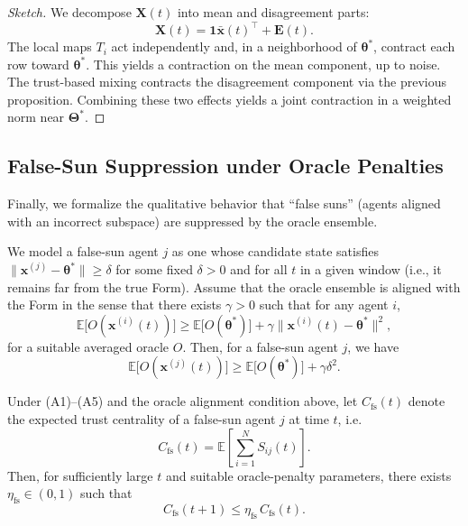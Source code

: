 \documentclass[11pt]{article}
\begin{document}
\begin{proof}[Sketch]
We decompose $\bm{X}(t)$ into mean and disagreement parts:
\[
  \bm{X}(t) = \bm{1} \bar{\bm{x}}(t)^\top + \bm{E}(t).
\]
The local maps $T_i$ act independently and, in a neighborhood of
$\bm{\theta}^*$, contract each row toward $\bm{\theta}^*$.
This yields a contraction on the mean component, up to noise.
The trust-based mixing contracts the disagreement component via the
previous proposition.
Combining these two effects yields a joint contraction in a weighted
norm near $\bm{\Theta}^*$.
\end{proof}

\subsection{False-Sun Suppression under Oracle Penalties}

Finally, we formalize the qualitative behavior that ``false suns'' (agents
aligned with an incorrect subspace) are suppressed by the oracle
ensemble.

We model a false-sun agent $j$ as one whose candidate state satisfies
$\|\bm{x}^{(j)} - \bm{\theta}^*\| \geq \delta$ for some fixed
$\delta > 0$ and for all $t$ in a given window (i.e., it remains far
from the true Form).
Assume that the oracle ensemble is aligned with the Form in the sense
that there exists $\gamma > 0$ such that for any agent $i$,
\[
  \mathbb{E}\bigl[ O(\bm{x}^{(i)}(t)) \bigr]
  \geq
  \mathbb{E}\bigl[ O(\bm{\theta}^*) \bigr]
  + \gamma \|\bm{x}^{(i)}(t) - \bm{\theta}^*\|^2,
\]
for a suitable averaged oracle $O$.
Then, for a false-sun agent $j$, we have
\[
  \mathbb{E}\bigl[ O(\bm{x}^{(j)}(t)) \bigr]
  \geq
  \mathbb{E}\bigl[ O(\bm{\theta}^*) \bigr]
  + \gamma \delta^2.
\]

\begin{proposition}
Under (A1)–(A5) and the oracle alignment condition above, let
$C_{\mathrm{fs}}(t)$ denote the expected trust centrality of a false-sun
agent $j$ at time $t$, i.e.
\[
  C_{\mathrm{fs}}(t)
  = \mathbb{E}\left[
      \sum_{i=1}^N S_{ij}(t)
    \right].
\]
Then, for sufficiently large $t$ and suitable oracle-penalty parameters,
there exists $\eta_{\mathrm{fs}} \in (0,1)$ such that
\[
  C_{\mathrm{fs}}(t+1)
  \leq
  \eta_{\mathrm{fs}} \, C_{\mathrm{fs}}(t).
\]
\end{proposition}
\end{document}
